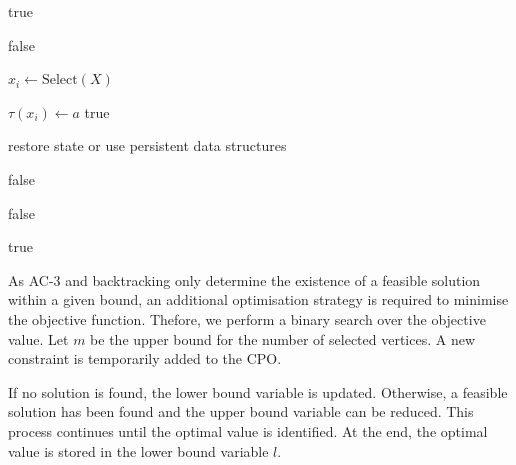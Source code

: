 \documentclass{report}
\begin{document}
\vspace{1\baselineskip}

\begin{algorithmic}


        \State \Return true
    \EndIf

        \State \Return false
    \EndIf

    \State $x_i \leftarrow \text{Select}(X)$

        \State $\tau(x_i) \leftarrow a$
                \State \Return true
            \EndIf
        \EndIf

        \State restore state or use persistent data structures
    \EndFor

    \State \Return false

\EndFunction
\end{algorithmic}

\vspace{1\baselineskip}

\begin{algorithmic}



            \State \Return false
        \EndIf

    \EndFor

    \State \Return true

\EndFunction

\end{algorithmic}

As AC-3 and backtracking only determine the existence of a feasible solution within a given bound, an additional optimisation strategy is required to minimise the objective function. Thefore,  we perform a binary search over the objective value. Let $m$ be the upper bound for the number of selected vertices. A new constraint is temporarily added to the CPO. 

If no solution is found, the lower bound variable is updated. Otherwise, a feasible solution has been found and the upper bound variable can be reduced. This process continues until the optimal value is identified. At the end, the optimal value is stored in the lower bound variable $l$.
\end{document}
